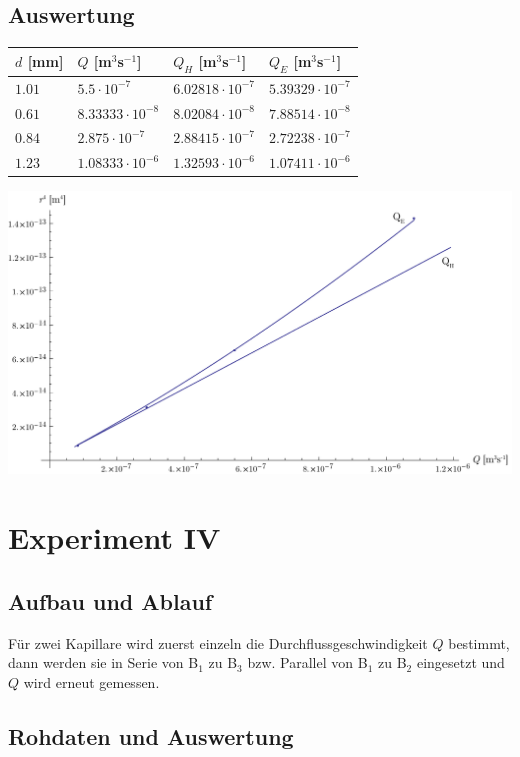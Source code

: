\documentclass[12pt,a4paper]{article}
\newcommand{\subscript}[1]{$_{#1}$}
\newcommand{\B}[1]{B\subscript{#1}}
\begin{document}
\subsection*{Auswertung}
\begin{tabular}{|l|l|l|l|}
\hline
$d$ [mm]&$Q$ [m$^3$s$^{-1}$]&$Q_H$ [m$^3$s$^{-1}$]&$Q_E$ [m$^3$s$^{-1}$]\\
\hline
$1.01$&$5.5\cdot 10^{-7}$&$6.02818\cdot 10^{-7}$&$5.39329\cdot 10^{-7}$\\
$0.61$&$8.33333\cdot 10^{-8}$&$8.02084\cdot 10^{-8}$&$7.88514\cdot 10^{-8}$\\
$0.84$&$2.875\cdot 10^{-7}$&$2.88415\cdot 10^{-7}$&$2.72238\cdot 10^{-7}$\\
$1.23$&$1.08333\cdot 10^{-6}$&$1.32593\cdot 10^{-6}$&$1.07411\cdot 10^{-6}$\\
\hline
\end{tabular}

\begin{center}
\includegraphics[width=15cm]{diagram3.pdf}
\end{center}


\section*{Experiment IV}

\subsection*{Aufbau und Ablauf}
F\"ur zwei Kapillare wird zuerst einzeln die Durchflussgeschwindigkeit $Q$ bestimmt, dann werden sie in Serie von \B{1} zu \B{3} bzw. Parallel von \B{1} zu \B{2} eingesetzt und $Q$ wird erneut gemessen.

\subsection*{Rohdaten und Auswertung}
\end{document}
